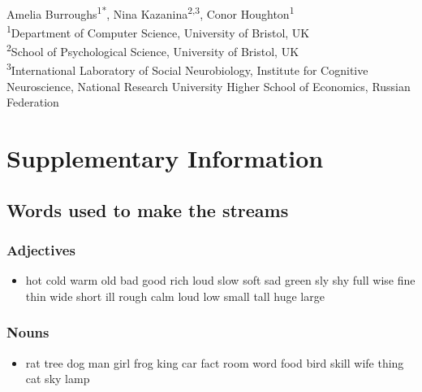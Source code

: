 \documentclass[11pt,a4wide]{article}
\begin{document}
\begin{flushleft}
{\Large
\textbf{} 
}
\newline
\\
Amelia Burroughs\textsuperscript{1*},
Nina Kazanina\textsuperscript{2,3},
Conor Houghton\textsuperscript{1}
\\
\bigskip
\textsuperscript{1}Department of Computer Science, University of Bristol, UK\\
\textsuperscript{2}School of Psychological Science, University of Bristol, UK\\
\textsuperscript{3}International
Laboratory of Social Neurobiology, Institute for Cognitive
Neuroscience, National Research University Higher School of Economics,
Russian Federation 

\end{flushleft}
\pagebreak{}


\section*{Supplementary Information}


\subsection*{Words used to make the streams}

\subsubsection*{Adjectives}
\begin{itemize}
  \item hot cold warm old bad good rich loud slow soft sad green sly
    shy full wise fine thin wide short ill rough calm loud low small
    tall huge large
\end{itemize}

\subsubsection*{Nouns}
\begin{itemize}
  \item rat tree dog man girl frog king car fact room word food bird
    skill wife thing cat sky lamp
\end{itemize}
\end{document}
